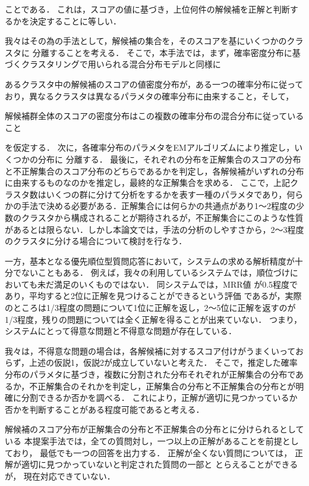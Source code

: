 \documentclass[japanese]{jnlp_1.4}
\begin{document}
\noindent
ことである．
これは，スコアの値に基づき，上位何件の解候補を正解と判断するかを決定することに等しい．

我々はその為の手法として，解候補の集合を，そのスコアを基にいくつかのクラスタに
分離することを考える．
そこで，本手法では，まず，確率密度分布に基づくクラスタリングで用いられる混合分布モデルと同様に
\par{}
 あるクラスタ中の解候補のスコアの値密度分布が，ある一つの確率分布に従っており，異なるクラスタは異なるパラメタの確率分布に由来すること，そして，

 解候補群全体のスコアの密度分布はこの複数の確率分布の混合分布に従っていること

\noindent
を仮定する．
次に，各確率分布のパラメタをEMアルゴリズムにより推定し，いくつかの分布に
分離する．
最後に，それぞれの分布を正解集合のスコアの分布と不正解集合のスコア分布のどちらであるかを判定し，各解候補がいずれの分布に由来するものなのかを推定し，最終的な正解集合を求める．
ここで，上記クラスタ数はいくつの群に分けて分析をするかを表す一種のパラメタであり，何らかの手法で決める必要がある．正解集合には何らかの共通点があり1〜2程度の少数のクラスタから構成されることが期待されるが，不正解集合にこのような性質があるとは限らない．しかし本論文では，手法の分析のしやすさから，2〜3程度のクラスタに分ける場合について検討を行なう．


一方，基本となる優先順位型質問応答において，システムの求める解析精度が十分でないこともある．
例えば，我々の利用しているシステム\cite{Mori:NTCIR4WN:JapaneseQASystemUsingA*SearchAndItsImprovement}では，順位づけにおいても未だ満足のいくものではない．
同システムでは，MRR値
が0.5程度であり，平均すると2位に正解を見つけることができるという評価
であるが，実際のところは1/3程度の問題について1位に正解を返し，2〜5位に正解を返すのが1/3程度，残りの問題については全く正解を得ることが出来ていない．
つまり，システムにとって得意な問題と不得意な問題が存在している．

我々は，不得意な問題の場合は，各解候補に対するスコア付けがうまくいっておらず，上述の仮説1，仮説2が成立していないと考えた．
そこで，推定した確率分布のパラメタに基づき，複数に分割された分布それぞれが正解集合の分布であるか，不正解集合のそれかを判定し，正解集合の分布と不正解集合の分布とが明確に分割できるか否かを調べる．
これにより，正解が適切に見つかっているか否かを判断することがある程度可能であると考える．

解候補のスコア分布が正解集合の分布と不正解集合の分布とに分けられるとしている
本提案手法では，全ての質問対し，一つ以上の正解があることを前提としており，
最低でも一つの回答を出力する．
正解が全くない質問については，
正解が適切に見つかっていないと判定された質問の一部と
とらえることができるが，
現在対応できていない．
\end{document}
